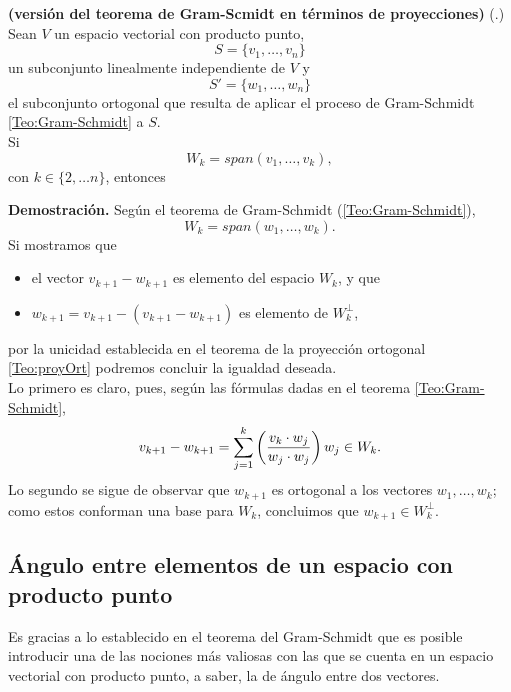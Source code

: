 \begin{prop} \label{Prop:Gram-Schmidt2}
\textbf{(versión del teorema de Gram-Scmidt en términos de
proyecciones)}
(.)
Sean $V$ un espacio vectorial con producto punto,
\[
S=\{ v_{1}, \ldots , v_{n}\}
\] un subconjunto
linealmente independiente de $V$ y
\[
S'=\{ w_{1}, \ldots , w_{n}\}
\] el subconjunto
ortogonal que resulta de aplicar el proceso de
Gram-Schmidt \ref{Teo:Gram-Schmidt} a $S$. \\
Si 
\[
W_{k}=span(v_{1}, \ldots , v_{k}), 
\]
con $k \in \{ 2, \ldots n\}$, entonces
\begin{center}
\end{center}
\end{prop}
\noindent
\textbf{Demostración.}
Según el teorema de Gram-Schmidt (\ref{Teo:Gram-Schmidt}),
\[
W_{k}=span(w_{1}, \ldots , w_{k}).
\]
Si mostramos que
\begin{itemize}
	\item el vector $v_{k+1}-w_{k+1}$ es elemento
	del espacio $W_{k}$, y que
	\item $w_{k+1}=v_{k+1}-(v_{k+1}-w_{k+1})$
	es elemento de $W_{k}^{\perp}$,
\end{itemize}
por la unicidad establecida en
el teorema de la proyección ortogonal \ref{Teo:proyOrt}
podremos concluir la igualdad deseada. \\
Lo primero es claro, pues, según las fórmulas
dadas en el teorema \ref{Teo:Gram-Schmidt},
\[
v_{k+1}-w_{k+1}= 
\sum\limits_{j=1}^{k}
\left( \frac{v_{k} \cdot w_{j}}{w_{j} \cdot w_{j}} \right) w_{j} \in W_{k}.
\]
Lo segundo se sigue de observar que
$w_{k+1}$ es ortogonal a los vectores $w_{1}, \ldots , w_{k}$;
como estos conforman una base para $W_{k}$, concluimos
que $w_{k+1} \in W_{k}^{\perp}$.


\QEDB
\vspace{0.2cm}

\subsection{Ángulo entre elementos de un espacio con producto punto}

Es gracias a lo establecido en el teorema del Gram-Schmidt
que es posible introducir una de las nociones
más valiosas con las que se cuenta en un espacio
vectorial con producto punto, a saber, la de ángulo entre dos
vectores.







\newpage